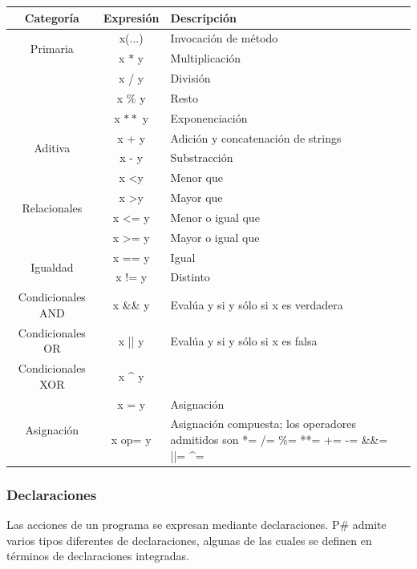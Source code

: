 \documentclass[12pt, letterpaper,spanish]{article}
\theoremstyle{definition}
\theoremstyle{remark}
\begin{document}
	\begin{center}
		\begin{tabular}{| c | c | m{5cm} | }
			\hline
			Categoría & Expresión & Descripción \\ \hline
			\multirow{2}{*}{Primaria} & x(...) & Invocación de método \\ \cline{2-3}		
			\multirow{4}{*}{Multiplicativa} & x $\ast$ y & Multiplicación \\ \cline{2-3}
			& x / y & División \\ \cline{2-3}
			& x \% y & Resto \\ \cline{2-3} 
			& x $\ast\ast$ y & Exponenciación \\ \hline
			\multirow{2}{*}{Aditiva} & x + y & Adición y concatenación de strings \\ \cline{2-3}
			& x - y & Substracción \\ \hline
			\multirow{4}{*}{Relacionales} & x <\;y & Menor que \\ \cline{2-3} 
			& x >\;y & Mayor que \\ \cline{2-3}
			& x <= y & Menor o igual que \\ \cline{2-3} 
			& x >= y & Mayor o igual que \\ \hline
			\multirow{2}{*}{Igualdad} & x == y & Igual \\ \cline{2-3} 
			& x != y & Distinto \\ \hline 
			Condicionales AND & x \&\& y & Evalúa y si y sólo si x es verdadera \\ \hline
			Condicionales OR & x || y & Evalúa y si y sólo si x es falsa \\ \hline
			Condicionales XOR & x \textasciicircum{} y & \\ \hline
			\multirow{2}{*}{Asignación} & x = y & Asignación \\ \cline{2-3}
			& x op= y & Asignación compuesta; los operadores admitidos son *= /= \%= **= += -= \&\&= ||= \textasciicircum{}= \\ \hline
		\end{tabular}
	\end{center}

	\subsubsection{Declaraciones}
	Las acciones de un programa se expresan mediante declaraciones. P\# admite varios tipos diferentes de declaraciones, algunas de las cuales se definen en términos de declaraciones integradas.
	
\end{document}
